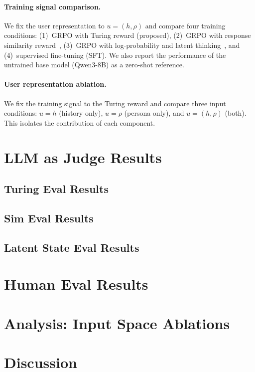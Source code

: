 \documentclass{article}
\begin{document}
\paragraph{Training signal comparison.}
We fix the user representation to $u = (h, \rho)$ and compare four training conditions: (1)~GRPO with Turing reward (proposed), (2)~GRPO with response similarity reward~\citep{wu2026humanlm}, (3)~GRPO with log-probability and latent thinking~\citep{gandhi2026dialogue}, and (4)~supervised fine-tuning (SFT). We also report the performance of the untrained base model (Qwen3-8B) as a zero-shot reference.
 
\paragraph{User representation ablation.}
We fix the training signal to the Turing reward and compare three input conditions: $u = h$ (history only), $u = \rho$ (persona only), and $u = (h, \rho)$ (both). This isolates the contribution of each component.
 
\section{LLM as Judge Results}
 
\subsection{Turing Eval Results}

\subsection{Sim Eval Results}

\subsection{Latent State Eval Results}

\section{Human Eval Results}

\section{Analysis: Input Space Ablations}

\section{Discussion}
 
\end{document}
